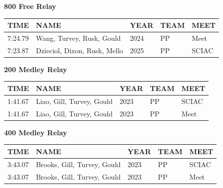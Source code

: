 \begin{table}[H]
\centering
\begin{minipage}[t]{0.6\textwidth}
\centering
\textbf{800 Free Relay}\\[0.1cm]
\begin{tabular}{@{}p{1.8cm}p{2.8cm}p{1.2cm}p{1.4cm}p{1.4cm}@{}}
\hline
    \textbf{TIME} & \textbf{NAME} & \textbf{YEAR} & \textbf{TEAM} & \textbf{MEET} \\
\hline
    7:24.79 & Wang, Turvey, Rusk, Gould & 2024 & PP & Meet \\
    7:23.87 & Dzieciol, Dixon, Rusk, Mello & 2025 & PP & SCIAC \\
\hline
\end{tabular}
\end{minipage}
\end{table}

\begin{table}[H]
\centering
\begin{minipage}[t]{0.6\textwidth}
\centering
\textbf{200 Medley Relay}\\[0.1cm]
\begin{tabular}{@{}p{1.8cm}p{2.8cm}p{1.2cm}p{1.4cm}p{1.4cm}@{}}
\hline
    \textbf{TIME} & \textbf{NAME} & \textbf{YEAR} & \textbf{TEAM} & \textbf{MEET} \\
\hline
    1:41.67 & Liao, Gill, Turvey, Gould & 2023 & PP & SCIAC \\
    1:41.67 & Liao, Gill, Turvey, Gould & 2023 & PP & Meet \\
\hline
\end{tabular}
\end{minipage}
\end{table}

\begin{table}[H]
\centering
\begin{minipage}[t]{0.6\textwidth}
\centering
\textbf{400 Medley Relay}\\[0.1cm]
\begin{tabular}{@{}p{1.8cm}p{2.8cm}p{1.2cm}p{1.4cm}p{1.4cm}@{}}
\hline
    \textbf{TIME} & \textbf{NAME} & \textbf{YEAR} & \textbf{TEAM} & \textbf{MEET} \\
\hline
    3:43.07 & Brooks, Gill, Turvey, Gould & 2023 & PP & SCIAC \\
    3:43.07 & Brooks, Gill, Turvey, Gould & 2023 & PP & Meet \\
\hline
\end{tabular}
\end{minipage}
\end{table}

